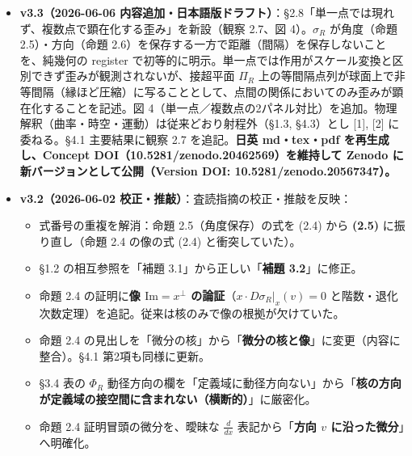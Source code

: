 \documentclass[
]{ltjsarticle}
\providecommand{\tightlist}{%
  \setlength{\itemsep}{0pt}\setlength{\parskip}{0pt}}
\begin{document}
\begin{itemize}
  \begin{itemize}
  \tightlist
  \item
    命題 2.4 に微分の像
    \(\mathrm{Im}(D\sigma_R|_x) = x^\perp = T_{\sigma_R(x)} S^n(R)\)
    を追記（式 2.4）。沈め込み構造をより明示的にし、\(\sigma_R(x)\)
    における球面の接空間が動径方向の直交補空間と一致することを明記。
  \end{itemize}
\item
  \textbf{v3.3（2026-06-06
  内容追加・日本語版ドラフト）}：§2.8「単一点では現れず、複数点で顕在化する歪み」を新設（観察
  2.7、図 4）。\(\sigma_R\) が角度（命題 2.5）・方向（命題
  2.6）を保存する一方で距離（間隔）を保存しないことを、純幾何の register
  で初等的に明示。単一点では作用がスケール変換と区別できず歪みが観測されないが、接超平面
  \(\Pi_R\)
  上の等間隔点列が球面上で非等間隔（縁ほど圧縮）に写ることとして、点間の関係においてのみ歪みが顕在化することを記述。図
  4（単一点／複数点の2パネル対比）を追加。物理解釈（曲率・時空・運動）は従来どおり射程外（§1.3,
  §4.3）とし {[}1{]}, {[}2{]} に委ねる。§4.1 主要結果に観察 2.7
  を追記。\textbf{日英 md・tex・pdf を再生成し、Concept
  DOI（10.5281/zenodo.20462569）を維持して Zenodo
  に新バージョンとして公開（Version DOI: 10.5281/zenodo.20567347）。}
\item
  \textbf{v3.2（2026-06-02 校正・推敲）}：査読指摘の校正・推敲を反映：

  \begin{itemize}
  \tightlist
  \item
    式番号の重複を解消：命題 2.5（角度保存）の式を (2.4) から
    \textbf{(2.5)} に振り直し（命題 2.4 の像の式 (2.4)
    と衝突していた）。
  \item
    §1.2 の相互参照を「補題 3.1」から正しい「\textbf{補題 3.2}」に修正。
  \item
    命題 2.4 の証明に\textbf{像 \(\mathrm{Im} = x^\perp\)
    の論証}（\(x \cdot D\sigma_R|_x(v) = 0\)
    と階数・退化次数定理）を追記。従来は核のみで像の根拠が欠けていた。
  \item
    命題 2.4
    の見出しを「微分の核」から「\textbf{微分の核と像}」に変更（内容に整合）。§4.1
    第2項も同様に更新。
  \item
    §3.4 表の \(\Phi_R\)
    動径方向の欄を「定義域に動径方向ない」から「\textbf{核の方向が定義域の接空間に含まれない（横断的）}」に厳密化。
  \item
    命題 2.4 証明冒頭の微分を、曖昧な \(\frac{d}{dx}\)
    表記から「\textbf{方向 \(v\) に沿った微分}」へ明確化。
  \end{itemize}
\end{itemize}
\end{document}
